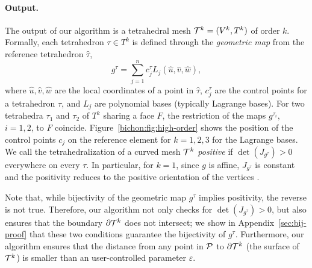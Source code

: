\paragraph{Output.}
The output of our algorithm is a tetrahedral mesh $\T^k = (V^k,T^k)$ of order $k$. 
Formally, each tetrahedron $\tau\in T^k$ is defined through the \emph{geometric map} from the reference tetrahedron $\hat \tau$,
\begin{equation}\label{eq:gmap}
g^\tau = \sum_{j=1}^n c_j^\tau L_j(\hat u,\hat v,\hat w),
\end{equation}
where $\hat u,\hat v,\hat w$ are the local coordinates of a point in $\hat \tau$, $c_j^\tau$ are the control points for a tetrahedron $\tau$, and $L_j$ are polynomial bases (typically Lagrange bases).
For two tetrahedra $\tau_1$ and $\tau_2$ 
of $T^k$ sharing a face $F$, the restriction of the maps $g^{\tau_i}$, $i=1,2$, to $F$ coincide.
Figure~\ref{bichon:fig:high-order} shows the position of the control points $c_j$ on the reference element for $k=1,2,3$ for the Lagrange bases. We call the tetrahedralization of a curved mesh $\T^k$ \emph{positive} if $\det(J_{g^\tau}) > 0$ everywhere on every $\tau$. 
In particular, for $k=1$, since $g$ is affine, $J_{g^\tau}$ is constant and the positivity reduces to the positive orientation of the vertices \cite{shewchuk1997adaptive}.

Note that, while bijectivity of the geometric map $g^\tau$ implies positivity, the reverse is not true. 
Therefore, our algorithm not only checks for $\det(J_{g^\tau}) > 0$, but also ensures that the boundary $\partial\T^k$ does not intersect; we show in Appendix~\ref{sec:bij-proof} that these two conditions guarantee the bijectivity of $g^\tau$.
Furthermore, our algorithm ensures that the distance from any point in $\P$ to $\partial\T^k$ (the surface of $\T^k$) is smaller than an user-controlled parameter $\varepsilon$.


